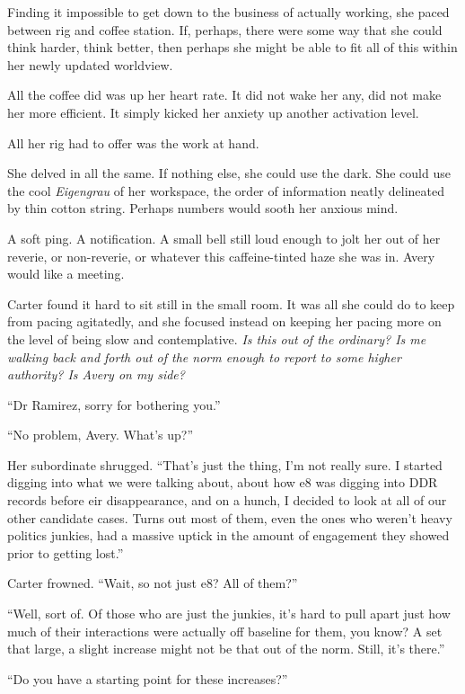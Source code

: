 Finding it impossible to get down to the business of actually working, she paced between rig and coffee station. If, perhaps, there were some way that she could think harder, think better, then perhaps she might be able to fit all of this within her newly updated worldview.

All the coffee did was up her heart rate. It did not wake her any, did not make her more efficient. It simply kicked her anxiety up another activation level.

All her rig had to offer was the work at hand.

She delved in all the same. If nothing else, she could use the dark. She could use the cool \emph{Eigengrau} of her workspace, the order of information neatly delineated by thin cotton string. Perhaps numbers would sooth her anxious mind.

A soft ping. A notification. A small bell still loud enough to jolt her out of her reverie, or non-reverie, or whatever this caffeine-tinted haze she was in. Avery would like a meeting.

Carter found it hard to sit still in the small room. It was all she could do to keep from pacing agitatedly, and she focused instead on keeping her pacing more on the level of being slow and contemplative. \emph{Is this out of the ordinary? Is me walking back and forth out of the norm enough to report to some higher authority? Is Avery on my side?}

``Dr Ramirez, sorry for bothering you.''

``No problem, Avery. What's up?''

Her subordinate shrugged. ``That's just the thing, I'm not really sure. I started digging into what we were talking about, about how e8 was digging into DDR records before eir disappearance, and on a hunch, I decided to look at all of our other candidate cases. Turns out most of them, even the ones who weren't heavy politics junkies, had a massive uptick in the amount of engagement they showed prior to getting lost.''

Carter frowned. ``Wait, so not just e8? All of them?''

``Well, sort of. Of those who are just the junkies, it's hard to pull apart just how much of their interactions were actually off baseline for them, you know? A set that large, a slight increase might not be that out of the norm. Still, it's there.''

``Do you have a starting point for these increases?''

